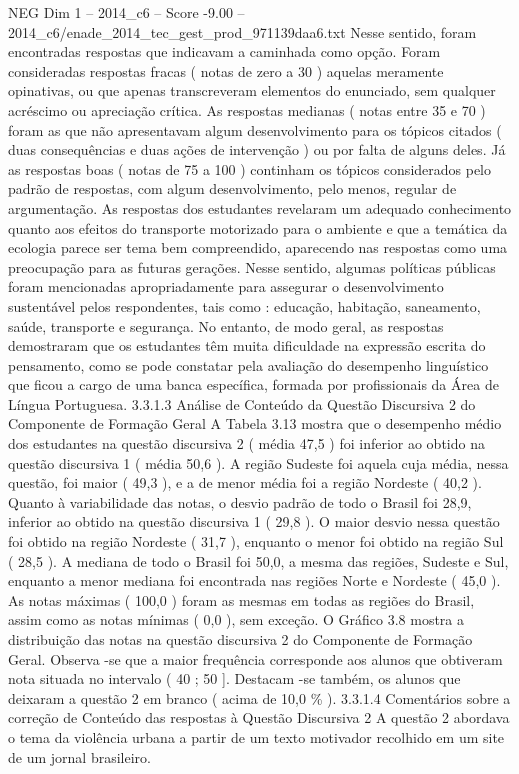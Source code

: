 \begin{textsample}{NEG Dim 1 – 2014\_c6 – Score -9.00 – 2014\_c6/enade\_2014\_tec\_gest\_prod\_971139daa6.txt}
Nesse sentido, foram encontradas respostas que indicavam a caminhada como opção.
Foram consideradas respostas fracas ( notas de zero a 30 ) aquelas meramente opinativas, ou que apenas transcreveram elementos do enunciado, sem qualquer acréscimo ou apreciação crítica.
As respostas medianas ( notas entre 35 e 70 ) foram as que não apresentavam algum desenvolvimento para os tópicos citados ( duas consequências e duas ações de intervenção ) ou por falta de alguns deles.
Já as respostas boas ( notas de 75 a 100 ) continham os tópicos considerados pelo padrão de respostas, com algum desenvolvimento, pelo menos, regular de argumentação.
As respostas dos estudantes revelaram um adequado conhecimento quanto aos efeitos do transporte motorizado para o ambiente e que a temática da ecologia parece ser tema bem compreendido, aparecendo nas respostas como uma preocupação para as futuras gerações.
Nesse sentido, algumas políticas públicas foram mencionadas apropriadamente para assegurar o desenvolvimento sustentável pelos respondentes, tais como : educação, habitação, saneamento, saúde, transporte e segurança.
No entanto, de modo geral, as respostas demostraram que os estudantes têm muita dificuldade na expressão escrita do pensamento, como se pode constatar pela avaliação do desempenho linguístico que ficou a cargo de uma banca específica, formada por profissionais da Área de Língua Portuguesa. 3.3.1.3 Análise de Conteúdo da Questão Discursiva 2 do Componente de Formação Geral A Tabela 3.13 mostra que o desempenho médio dos estudantes na questão discursiva 2 ( média 47,5 ) foi inferior ao obtido na questão discursiva 1 ( média 50,6 ).
A região Sudeste foi aquela cuja média, nessa questão, foi maior ( 49,3 ), e a de menor média foi a região Nordeste ( 40,2 ).
Quanto à variabilidade das notas, o desvio padrão de todo o Brasil foi 28,9, inferior ao obtido na questão discursiva 1 ( 29,8 ).
O maior desvio nessa questão foi obtido na região Nordeste ( 31,7 ), enquanto o menor foi obtido na região Sul ( 28,5 ).
A mediana de todo o Brasil foi 50,0, a mesma das regiões, Sudeste e Sul, enquanto a menor mediana foi encontrada nas regiões Norte e Nordeste ( 45,0 ).
As notas máximas ( 100,0 ) foram as mesmas em todas as regiões do Brasil, assim como as notas mínimas ( 0,0 ), sem exceção.
O Gráfico 3.8 mostra a distribuição das notas na questão discursiva 2 do Componente de Formação Geral.
Observa -se que a maior frequência corresponde aos alunos que obtiveram nota situada no intervalo ( 40 ; 50 ].
Destacam -se também, os alunos que deixaram a questão 2 em branco ( acima de 10,0 \% ). 3.3.1.4 Comentários sobre a correção de Conteúdo das respostas à Questão Discursiva 2 A questão 2 abordava o tema da violência urbana a partir de um texto motivador recolhido em um site de um jornal brasileiro.

\end{textsample}
